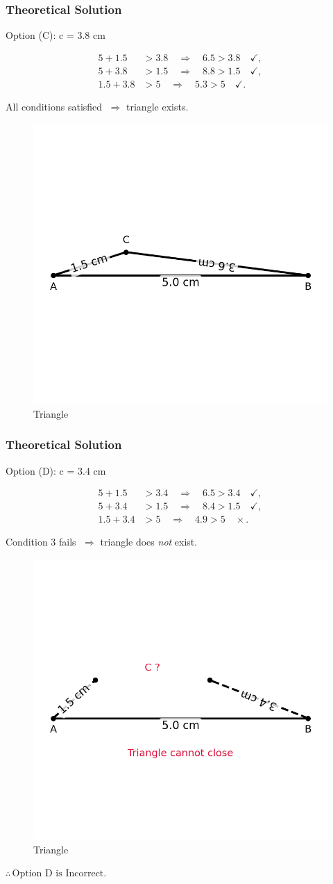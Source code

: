 \documentclass{beamer}
\begin{document}
\begin{frame}[fragile]
    \frametitle{Theoretical Solution}
 
Option (C): c = 3.8 cm

\begin{align}
5 + 1.5 &> 3.8 \quad\Rightarrow\quad 6.5 > 3.8\quad\checkmark,\\
5 + 3.8 &> 1.5 \quad\Rightarrow\quad 8.8 > 1.5\quad\checkmark,\\
1.5 + 3.8 &> 5 \quad\Rightarrow\quad 5.3 > 5\quad\checkmark.
\end{align}

All conditions satisfied $\;\Rightarrow$ triangle exists.

\begin{figure}[htbp]
\centering
\includegraphics[width=0.3\columnwidth]{figs/fig1.png}
\caption{Triangle}
\label{fig:figs/fig3.png}
\end{figure}

\bigskip

\end{frame}

\begin{frame}[fragile]
    \frametitle{Theoretical Solution}
 Option (D): c = 3.4 cm

\begin{align}
5 + 1.5 &> 3.4 \quad\Rightarrow\quad 6.5 > 3.4\quad\checkmark,\\
5 + 3.4 &> 1.5 \quad\Rightarrow\quad 8.4 > 1.5\quad\checkmark,\\
1.5 + 3.4 &> 5 \quad\Rightarrow\quad 4.9 > 5\quad\times.
\end{align}

Condition 3 fails $\;\Rightarrow$ triangle does \emph{not} exist.
\begin{figure}[htbp]
\centering
\includegraphics[width=0.4\columnwidth]{figs/fig4.png}
\caption{Triangle}
\label{fig:figs/fig4.png}
\end{figure}

$\boxed{\therefore \, \text{Option D is Incorrect.}}$

\end{frame}
\end{document}
